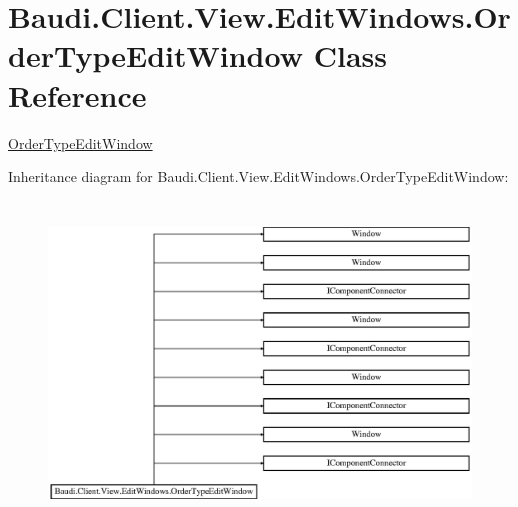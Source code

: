 \hypertarget{class_baudi_1_1_client_1_1_view_1_1_edit_windows_1_1_order_type_edit_window}{}\section{Baudi.\+Client.\+View.\+Edit\+Windows.\+Order\+Type\+Edit\+Window Class Reference}
\label{class_baudi_1_1_client_1_1_view_1_1_edit_windows_1_1_order_type_edit_window}


\hyperlink{class_baudi_1_1_client_1_1_view_1_1_edit_windows_1_1_order_type_edit_window}{Order\+Type\+Edit\+Window}  


Inheritance diagram for Baudi.\+Client.\+View.\+Edit\+Windows.\+Order\+Type\+Edit\+Window\+:\begin{figure}[H]
\begin{center}
\leavevmode
\includegraphics[height=8.588957cm]{class_baudi_1_1_client_1_1_view_1_1_edit_windows_1_1_order_type_edit_window}
\end{center}
\end{figure}
